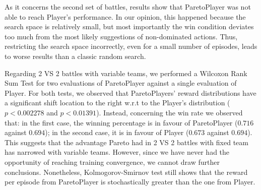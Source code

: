 As it concerns the second set of battles, results show that ParetoPlayer was not able to reach Player's performance. In our opinion, this happened because the search space is relatively small, but most importantly the win condition deviates too much from the most likely suggestions of non-dominated actions. Thus, restricting the search space incorrectly, even for a small number of episodes, leads to worse results than a classic random search.

Regarding 2 VS 2 battles with variable teams, we performed a Wilcoxon Rank Sum Test for two evaluations of ParetoPlayer against a single evaluation of Player. For both tests, we observed that ParetoPlayers' reward distributions have a significant shift location to the right w.r.t to the Player's distribution ($p < 0.002278$ and $p < 0.01391$). Instead, concerning the win rate we observed that: in the first case, the winning percentage is in favour of ParetoPlayer ($0.716$ against $0.694$); in the second case, it is in favour of Player ($0.673$ against $0.694$). This suggests that the advantage Pareto had in 2 VS 2 battles with fixed team has narrowed with variable teams. However, since we have never had the opportunity of reaching training convergence, we cannot draw further conclusions. Nonetheless, Kolmogorov-Smirnov test still shows that the reward per episode from ParetoPlayer is stochastically greater than the one from Player.